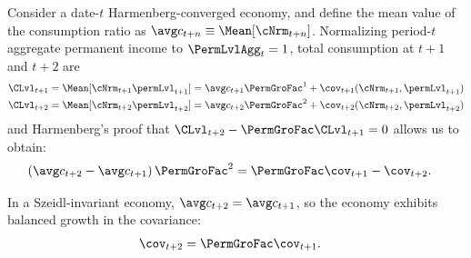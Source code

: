 \documentclass[BufferStockTheory]{subfiles}
\begin{document}
Consider a date-$t$ Harmenberg-converged economy, and define the mean value of the consumption ratio as $\cNrmAvg_{t+n} \equiv \Mean[\cNrm_{t+n}]$.
Normalizing period-$t$ aggregate permanent income to $\PermLvlAgg_{t}=1$, total consumption at $t+1$ and $t+2$ are
\begin{equation}\label{eq:atp2vsatp1}
  \begin{aligned}
    \CLvl_{t+1} & = \Mean[\cNrm_{t+1}\permLvl_{t+1}] = \cNrmAvg_{t+1}\PermGroFac^{1} + \cov_{t+1}(\cNrm_{t+1}, \permLvl_{t+1})
    \\  \CLvl_{t+2} & = \Mean[\cNrm_{t+2}\permLvl_{t+2}] = \cNrmAvg_{t+2}\PermGroFac^{2} + \cov_{t+2}(\cNrm_{t+2}, \permLvl_{t+2})
  \end{aligned}
\end{equation}
and Harmenberg's proof that $\CLvl_{t+2}-\PermGroFac \CLvl_{t+1}=0$ allows us to obtain:
\begin{equation} \label{eq:cNrmvsCov}\begin{aligned}
    \left(\cNrmAvg_{t+2} - \cNrmAvg_{t+1}\right)\PermGroFac^{2} & = \PermGroFac \cov_{t+1} - \cov_{t+2} .
  \end{aligned}\end{equation}

In a Szeidl-invariant economy, $\cNrmAvg_{t+2} = \cNrmAvg_{t+1}$, so the economy exhibits balanced growth in the covariance:
\begin{equation}\begin{gathered}\begin{aligned}
  \cov_{t+2} & = \PermGroFac \cov_{t+1}.
\end{aligned}\end{gathered}\end{equation}
\end{document}
